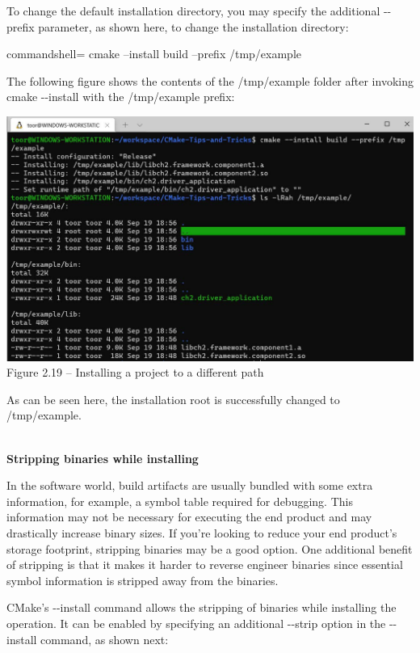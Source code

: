 To change the default installation directory, you may specify the additional -{}-prefix parameter, as shown here, to change the installation directory:

\begin{tcblisting}{commandshell={}}
cmake --install build --prefix /tmp/example
\end{tcblisting}

The following figure shows the contents of the /tmp/example folder after invoking cmake -{}-install with the /tmp/example prefix:

\begin{center}
\includegraphics[width=1.\textwidth]{content/1/chapter2/images/19.jpg}\\
Figure 2.19 – Installing a project to a different path
\end{center}

As can be seen here, the installation root is successfully changed to /tmp/example.

\hspace*{\fill} \\ %
\noindent
\textbf{Stripping binaries while installing}

In the software world, build artifacts are usually bundled with some extra information, for example, a symbol table required for debugging. This information may not be necessary for executing the end product and may drastically increase binary sizes. If you're looking to reduce your end product's storage footprint, stripping binaries may be a good option. One additional benefit of stripping is that it makes it harder to reverse engineer binaries since essential symbol information is stripped away from the binaries.

CMake's -{}-install command allows the stripping of binaries while installing the operation. It can be enabled by specifying an additional -{}-strip option in the -{}-install command, as shown next:

